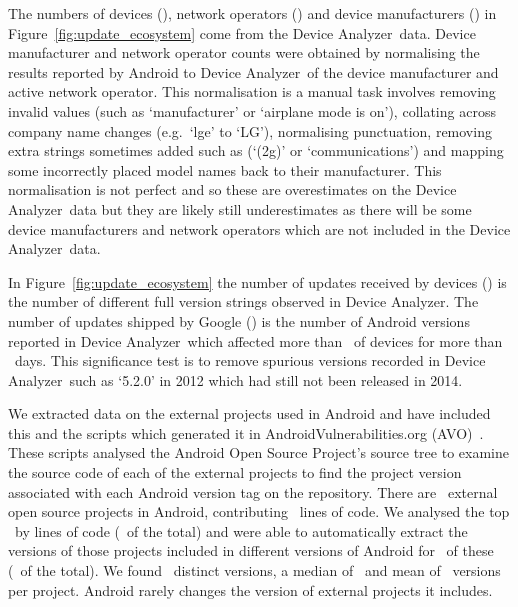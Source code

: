 \documentclass{sig-alternate}
\newcommand{\da}{Device Analyzer}
\newcommand{\avo}{AVO}
\begin{document}
The numbers of devices (\daNumOSDevices), network operators (\daNumOperators) and device manufacturers (\daNumManufacturers) in Figure~\ref{fig:update_ecosystem} come from the \da\ data.
Device manufacturer and network operator counts were obtained by normalising the results reported by Android to \da\ of the device manufacturer and active network operator.
This normalisation is a manual task involves removing invalid values (such as `manufacturer' or `airplane mode is on'), collating across company name changes (e.g.\ `lge' to `LG'), normalising punctuation, removing extra strings sometimes added such as (`(2g)' or `communications') and mapping some incorrectly placed model names back to their manufacturer.
This normalisation is not perfect and so these are overestimates on the \da\ data but they are likely still underestimates as there will be some device manufacturers and network operators which are not included in the \da\ data.

In Figure~\ref{fig:update_ecosystem} the number of updates received by devices (\daNumFullVersions) is the number of different full version strings observed in \da.
The number of updates shipped by Google (\daNumSigOSVersions) is the number of Android versions reported in \da\ which affected more than \daSigVersionPerc\ of devices for more than \daSigVersionDays\ days.
This significance test is to remove spurious versions recorded in \da\ such as `5.2.0' in 2012 which had still not been released in 2014.

We extracted data on the external projects used in Android and have included this and the scripts which generated it in AndroidVulnerabilities.org (\avo)~\cite{androidvulnerabilities.org}.
These scripts analysed the Android Open Source Project's source tree to examine the source code of each of the external projects to find the project version associated with each Android version tag on the repository.
There are \avoNumExternalProjects\ external open source projects in Android, contributing \avoTotalExternalLines\ lines of code.
We analysed the top \avoNumBigExternalProjects\ by lines of code (\avoBigExternalLinesOfCodePerc\ of the total) and were able to automatically extract the versions of those projects included in different versions of Android for \avoNumAnalysedExternalProjects\ of these (\avoAnalysedExternalLinesOfCodePerc\ of the total).
We found \avoBigExternalTotalVersions\ distinct versions, a median of \avoBigExternalMedianVersions\ and mean of \avoBigExternalMeanVersions\ versions per project.
Android rarely changes the version of external projects it includes.
\end{document}
